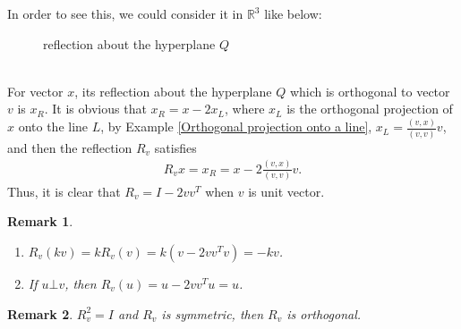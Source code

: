 \documentclass[11pt]{book}
\newtheorem{remark}{Remark}[chapter]
\theoremstyle{definition}
\numberwithin{equation}{chapter}
\begin{document}
\begin{subappendices}
In order to see this, we could consider it in $\mathbb{R}^3$ like below:\\
\begin{figure}[h]
    \centering
    \caption{reflection about the hyperplane $Q$}
    \label{fig:plot_2}
\end{figure}\\
For vector $x$, its reflection about the hyperplane $Q$ which is orthogonal to vector $v$ is $x_R$. It is obvious that $x_R = x - 2 x_L$, where $x_L$ is the orthogonal projection of $x$ onto the line $L$, by Example \ref{Orthogonal projection onto a line}, $x_L = \frac{(v,x)}{(v,v)}v$, and then the reflection $R_v$ satisfies
\begin{align*}
    R_v x = x_R = x - 2 \frac{(v,x)}{(v,v)}v.
\end{align*}
Thus, it is clear that $R_v = I - 2 v v^T$ when $v$ is unit vector. 

\begin{remark}
~\begin{enumerate}[label=(\arabic*)]
    \item $R_v(kv) = k R_v(v) = k (v - 2 v v^T v) = -kv$.
    
    \item If $u \bot v$, then $R_v(u) = u - 2 v v^T u = u$.
\end{enumerate}
\end{remark}

\begin{remark}
$R_v^2 = I$ and $R_v$ is symmetric, then $R_v$ is orthogonal.
\end{remark}


\end{subappendices}
\end{document}
